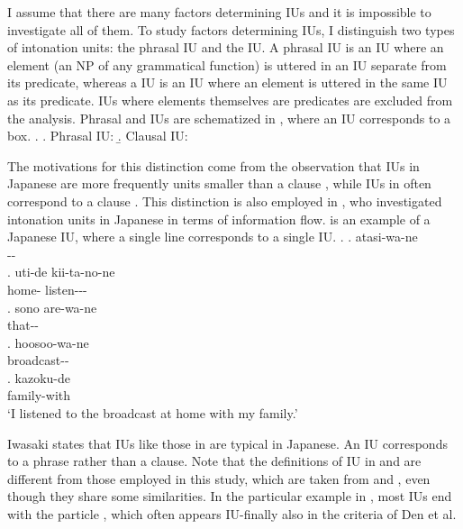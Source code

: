 I assume that there are many factors determining IUs
and it is impossible to investigate all of them.
To study  factors determining IUs,
I distinguish two types of intonation units:
the phrasal IU and the  IU.
A phrasal IU is an IU where an element (an NP of any grammatical function) is uttered in an IU separate from its predicate, whereas
a  IU is an IU where an element is uttered in the same IU as its predicate.
IUs where elements themselves are predicates are excluded from the analysis.
Phrasal and  IUs are schematized in \Next,
where an IU corresponds to a box.
%
\ex.
 \a. Phrasal IU:  
 \b. Clausal IU: 

The motivations for this distinction come from the observation that IUs in Japanese are more frequently units smaller than a clause \cite{iwasaki93},
while IUs in  often correspond to a clause \cite{chafe94}.
This distinction is also employed in ,
who investigated intonation units in Japanese in terms of information flow.
\Next is an example of a Japanese IU,
where a single line corresponds to a single IU.
%
\ex.
 \ag. atasi-wa-ne \\
 		-- \\
 \bg. uti-de kii-ta-no-ne \\
 	home- listen--- \\
 \bg. sono are-wa-ne \\
 	 that-- \\
 \bg. hoosoo-wa-ne \\
 	broadcast--\\
 \bg. kazoku-de \\
 	family-with \\
	`I listened to the broadcast at home with my family.'
	\hfill{\cite[][p.~40]{iwasaki93}}

Iwasaki states that IUs like those in \Last are typical in Japanese.
An IU corresponds to a phrase rather than a clause.
Note that the definitions of IU in  and  are different from those employed in this study, which are taken from  and ,
even though they share some similarities.
In the particular example in \Last,
most IUs end with the  particle ,
which often appears IU-finally also in the criteria of Den et al.


